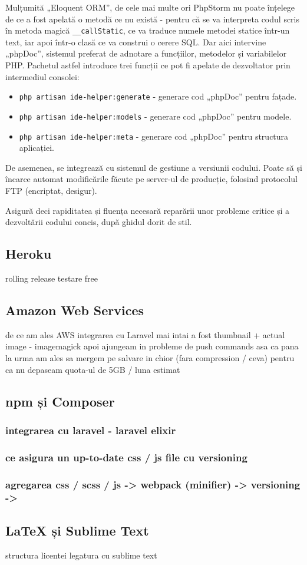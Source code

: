 		Mulțumită „Eloquent ORM”, de cele mai multe ori PhpStorm nu poate înțelege de ce a fost apelată o metodă ce nu există - pentru că se va interpreta codul scris în metoda magică \verb|__callStatic|, ce va traduce numele metodei statice într-un text, iar apoi într-o clasă ce va construi o cerere SQL.
		Dar aici intervine „phpDoc”, sistemul preferat de adnotare a funcțiilor, metodelor și variabilelor PHP.
		Pachetul astfel introduce trei funcții ce pot fi apelate de dezvoltator prin intermediul consolei:
			\begin{itemize}
				\item
				\verb|php artisan ide-helper:generate| - generare cod „phpDoc” pentru fațade.
				\item
				\verb|php artisan ide-helper:models| - generare cod „phpDoc” pentru modele.
				\item
				\verb|php artisan ide-helper:meta| - generare cod „phpDoc” pentru structura aplicației.
			\end{itemize}

		De asemenea, se integrează cu sistemul de gestiune a versiunii codului.
		Poate să și încarce automat modificările făcute pe server-ul de producție, folosind protocolul FTP (encriptat, desigur).

		Asigură deci rapiditatea și fluența necesară reparării unor probleme critice și a dezvoltării codului concis, după ghidul dorit de stil.
	\subsection{Heroku}
		rolling release
		testare
		free
	\subsection{Amazon Web Services}
		de ce am ales AWS
		integrarea cu Laravel
		mai intai a fost thumbnail + actual image - imagemagick
		apoi ajungeam in probleme de push commands
		asa ca pana la urma am ales sa mergem pe salvare in chior (fara compression / ceva)
			pentru ca nu depaseam quota-ul de 5GB / luna estimat
	\subsection{npm și Composer}
		\subsubsection{integrarea cu laravel - laravel elixir}
		\subsubsection{ce asigura un up-to-date css / js file cu versioning}
		\subsubsection{agregarea css / scss / js -> webpack (minifier) -> versioning ->}
	\subsection{LaTeX și Sublime Text}
		structura licentei
		legatura cu sublime text
